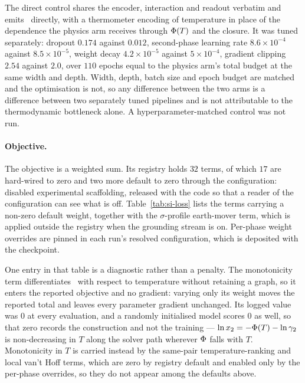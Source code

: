 The direct control shares the encoder, interaction and readout verbatim and emits \lnx\ directly,
with a thermometer encoding of temperature in place of the dependence the physics arm receives
through $\Phi(T)$ and the closure. It was tuned separately: dropout $0.174$ against $0.012$,
second-phase learning rate $8.6\times10^{-4}$ against $8.5\times10^{-5}$, weight decay
$4.2\times10^{-5}$ against $5\times10^{-4}$, gradient clipping $2.54$ against $2.0$, over $110$
epochs equal to the physics arm's total budget at the same width and depth. Width, depth, batch
size and epoch budget are matched and the optimisation is not, so any difference between the two
arms is a difference between two separately tuned pipelines and is not attributable to the
thermodynamic bottleneck alone. A hyperparameter-matched control was not run.

\paragraph{Objective.}
The objective is a weighted sum. Its registry holds $32$ terms, of which $17$ are hard-wired to
zero and two more default to zero through the configuration: disabled experimental scaffolding,
released with the code so that a reader of the configuration can see what is off.
Table~\ref{tab:si-loss} lists the terms carrying a non-zero default weight, together with the
$\sigma$-profile earth-mover term, which is applied outside the registry when the grounding stream
is on. Per-phase weight overrides are pinned in each run's resolved configuration, which is
deposited with the checkpoint.

One entry in that table is a diagnostic rather than a penalty. The monotonicity term
differentiates \lnx\ with respect to temperature without retaining a graph, so it enters
the reported objective and no gradient: varying only its weight moves the reported total
and leaves every parameter gradient unchanged. Its logged value was $0$ at every
evaluation, and a randomly initialised model scores $0$ as well, so that zero records the
construction and not the training --- $\ln x_2 = -\Phi(T) - \ln\gamma_2$ is non-decreasing in $T$
along the solver path wherever $\Phi$ falls with $T$. Monotonicity in $T$ is carried
instead by the same-pair temperature-ranking and local van't Hoff terms, which are zero by
registry default and enabled only by the per-phase overrides, so they do not appear among
the defaults above.

